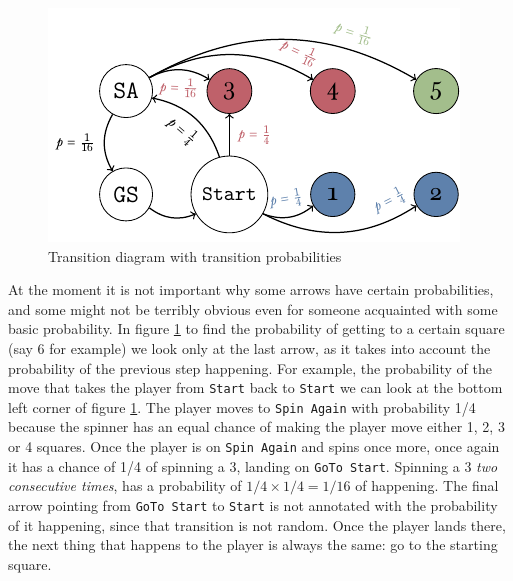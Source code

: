 \begin{figure}[h]
	\centering
	\includegraphics[width=\textwidth]{img/transicion-markov.pdf}
	\caption{Transition diagram with transition probabilities}
	\label{fig:annotated-markov-start}
\end{figure}

At the moment it is not important why some arrows have certain 
probabilities, and some might not be terribly obvious even for 
someone acquainted with some basic probability. In figure 
\ref{fig:annotated-markov-start} to find the probability 
of getting to a certain square (say 6 for example) we look only 
at the last arrow, as it takes into account the probability of 
the previous step happening. For example, the probability of 
the move that takes the player from \texttt{Start} back to 
\texttt{Start} we can look at the bottom left corner of figure 
\ref{fig:annotated-markov-start}. The player moves to 
\texttt{Spin Again} with probability 1/4 because the spinner 
has an equal chance of making the player move either 1, 2, 3 or 
4 squares. Once the player is on \texttt{Spin Again} and spins 
once more, once again it has a chance of 1/4 of spinning a 3, 
landing on \texttt{GoTo Start}. Spinning a 3 \textit{two 
consecutive times}, has a probability of $1/4 \times 1/4 = 
1/16$ of happening. The final arrow pointing from \texttt{GoTo 
Start} to \texttt{Start} is not annotated with the probability 
of it happening, since that transition is not random. Once the 
player lands there, the next thing that happens to the player 
is always the same: go to the starting square.

